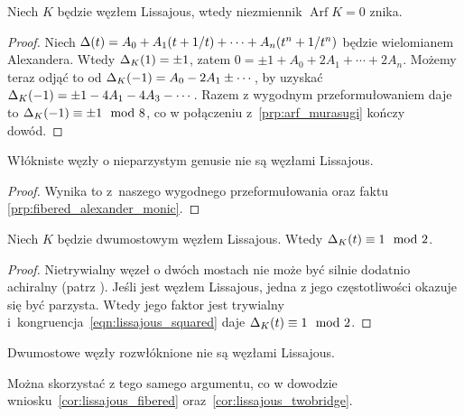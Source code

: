 \begin{corollary}
%
    Niech $K$ będzie węzłem Lissajous, wtedy niezmiennik $\operatorname{Arf} K = 0$ znika.
\end{corollary}

\begin{proof}
    Niech $\Delta(t) = A_0 + A_1(t+1/t) + \cdots + A_n(t^n + 1/t^n)$ będzie  wielomianem Alexandera.
    Wtedy $\Delta_K(1) = \pm 1$, zatem $0 = \pm 1 + A_0 + 2A_1 + \cdots + 2A_n$.
    Możemy teraz odjąć to od $\Delta_K(-1) = A_0 - 2A_1 \pm \cdots$, by uzyskać $\Delta_K(-1) = \pm 1 - 4A_1 - 4A_3 - \cdots$.
    Razem z wygodnym przeformułowaniem daje to $\Delta_K(-1) \equiv \pm 1 \mod 8$, co w połączeniu z~\ref{prp:arf_murasugi} kończy dowód.
\end{proof}

\begin{corollary}
%
\label{cor:lissajous_fibered}%
    Włókniste węzły o nieparzystym genusie nie są węzłami Lissajous.
\end{corollary}

\begin{proof}
    Wynika to z~naszego wygodnego przeformułowania oraz faktu \ref{prp:fibered_alexander_monic}.
\end{proof}

\begin{corollary}
%
\label{cor:lissajous_twobridge}%
    Niech $K$ będzie dwumostowym węzłem Lissajous.
    Wtedy $\Delta_K(t) \equiv 1 \mod 2$.
\end{corollary}

\begin{proof}
    Nietrywialny węzeł o dwóch mostach nie może być silnie dodatnio achiralny (patrz \cite{hartley1979}).
    Jeśli jest węzłem Lissajous, jedna z jego częstotliwości okazuje się być parzysta.
    Wtedy jego faktor jest trywialny i~kongruencja~\ref{eqn:lissajous_squared} daje $\Delta_K(t) \equiv 1 \mod 2$.
\end{proof}

\begin{corollary}
%
    Dwumostowe węzły rozwłóknione nie są węzłami Lissajous.
\end{corollary}

Można skorzystać z tego samego argumentu, co w dowodzie wniosku~\ref{cor:lissajous_fibered} oraz~\ref{cor:lissajous_twobridge}.

